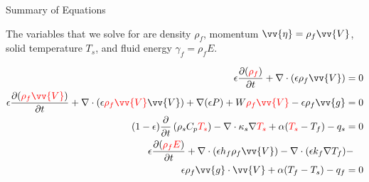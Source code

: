 \documentclass{beamer}
\begin{document}

\begin{frame}{Summary of Equations}

The variables that we solve for are density \color{red}\(\rho_f\)\color{black}, momentum \color{red}\(\vv{\eta}=\rho_f\vv{V}\)\color{black}, solid temperature \color{red}\(T_s\)\color{black}, and fluid energy \color{red}\(\gamma_f=\rho_fE\)\color{black}.

\begin{equation}
\begin{aligned}
\epsilon\frac{\partial (\color{red}\rho_f\color{black})}{\partial t} + \nabla\cdot(\epsilon\rho_f\vv{V})=0\\
\epsilon\frac{\partial(\color{red}\rho_f\vv{V}\color{black})}{\partial t}+\nabla\cdot(\epsilon\color{red}\rho_f\vv{V}\color{black}\vv{V})+\nabla(\epsilon P)+W\color{red}\rho_f\vv{V}\color{black}-\epsilon\rho_f\vv{g}=0 \\
(1-\epsilon)\frac{\partial}{\partial t} \left(\rho_s C_p\color{red}T_s\color{black}\right)-\nabla\cdot \kappa_s\nabla \color{red}T_s\color{black}+\alpha(\color{red}T_s\color{black}-T_f)-q_s=0\\
\epsilon\frac{\partial(\color{red}\rho_f E\color{black})}{\partial t}+\nabla\cdot(\epsilon h_f\rho_f\vv{V})-\nabla\cdot(\epsilon k_f\nabla T_f) -\quad\\
 \epsilon\rho_f \vv{g}\cdot\vv{V}+\alpha(T_f-T_s)-q_f=0\\
\end{aligned}
\end{equation}

\end{frame}

\end{document}

